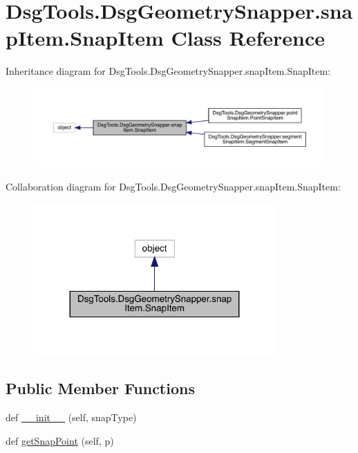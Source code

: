\hypertarget{class_dsg_tools_1_1_dsg_geometry_snapper_1_1snap_item_1_1_snap_item}{}\section{Dsg\+Tools.\+Dsg\+Geometry\+Snapper.\+snap\+Item.\+Snap\+Item Class Reference}
\label{class_dsg_tools_1_1_dsg_geometry_snapper_1_1snap_item_1_1_snap_item}


Inheritance diagram for Dsg\+Tools.\+Dsg\+Geometry\+Snapper.\+snap\+Item.\+Snap\+Item\+:
\nopagebreak
\begin{figure}[H]
\begin{center}
\leavevmode
\includegraphics[width=350pt]{class_dsg_tools_1_1_dsg_geometry_snapper_1_1snap_item_1_1_snap_item__inherit__graph}
\end{center}
\end{figure}


Collaboration diagram for Dsg\+Tools.\+Dsg\+Geometry\+Snapper.\+snap\+Item.\+Snap\+Item\+:
\nopagebreak
\begin{figure}[H]
\begin{center}
\leavevmode
\includegraphics[width=263pt]{class_dsg_tools_1_1_dsg_geometry_snapper_1_1snap_item_1_1_snap_item__coll__graph}
\end{center}
\end{figure}
\subsection*{Public Member Functions}
\begin{DoxyCompactItemize}
\item 
def \mbox{\hyperlink{class_dsg_tools_1_1_dsg_geometry_snapper_1_1snap_item_1_1_snap_item_ac3597e8d8913b25c729a723138f1afb7}{\+\_\+\+\_\+init\+\_\+\+\_\+}} (self, snap\+Type)
\item 
def \mbox{\hyperlink{class_dsg_tools_1_1_dsg_geometry_snapper_1_1snap_item_1_1_snap_item_a534f837b8dc738b8d80ec74430a13b6f}{get\+Snap\+Point}} (self, p)
\end{DoxyCompactItemize}
